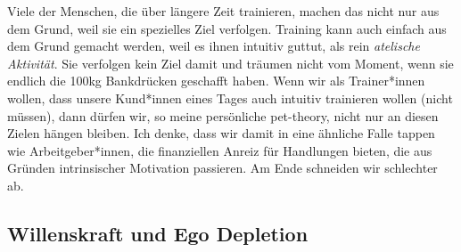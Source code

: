 \documentclass[
  letterpaper,
  DIV=11,
  numbers=noendperiod]{scrreprt}
\begin{document}
Viele der Menschen, die über längere Zeit trainieren, machen das nicht
nur aus dem Grund, weil sie ein spezielles Ziel verfolgen. Training kann
auch einfach aus dem Grund gemacht werden, weil es ihnen intuitiv
guttut, als rein \emph{atelische} \emph{Aktivität}. Sie verfolgen kein
Ziel damit und träumen nicht vom Moment, wenn sie endlich die 100kg
Bankdrücken geschafft haben. Wenn wir als Trainer*innen wollen, dass
unsere Kund*innen eines Tages auch intuitiv trainieren wollen (nicht
müssen), dann dürfen wir, so meine persönliche pet-theory, nicht nur an
diesen Zielen hängen bleiben. Ich denke, dass wir damit in eine ähnliche
Falle tappen wie Arbeitgeber*innen, die finanziellen Anreiz für
Handlungen bieten, die aus Gründen intrinsischer Motivation passieren.
Am Ende schneiden wir schlechter ab.

\subsection{Willenskraft und Ego
Depletion}\label{willenskraft-und-ego-depletion}
\end{document}
